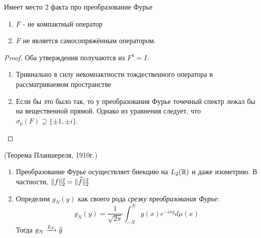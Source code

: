 \begin{corollary}
	Имеет место 2 факта про преобразование Фурье
	\begin{enumerate}
		\item $F$ - не компактный оператор
		
		\item $F$ не является самосопряжённым оператором.
	\end{enumerate}
\end{corollary}

\begin{proof}
	Оба утверждения получаются из $F^4 = I$:
	\begin{enumerate}
		\item Тривиально в силу некомпактности тождественного оператора в рассматриваемом пространстве
		
		\item Если бы это было так, то у преобразования Фурье точечный спектр лежал бы на вещественной прямой. Однако из уравнения следует, что $\sigma_p(F) \supseteq \{\pm 1, \pm i\}$.
	\end{enumerate}
\end{proof}

\begin{proposition} (Теорема Планшереля, 1910г.)
	\begin{enumerate}
		\item Преобразование Фурье осуществляет биекцию на $L_2(\mathbb{R})$ и даже изометрию. В частности, $\|f\|_2^2 = \|\widehat{f}\|_2^2$
		
		\item Определим $g_N(y)$ как своего рода \textit{срезку преобразования Фурье}:
		\[
			g_N(y) = \frac{1}{\sqrt{2\pi}}\int_{-N}^N g(x)e^{-ixy}d\mu(x)
		\]
		Тогда $g_N \xrightarrow[]{L_2} \widehat{g}$
	\end{enumerate}
\end{proposition}

